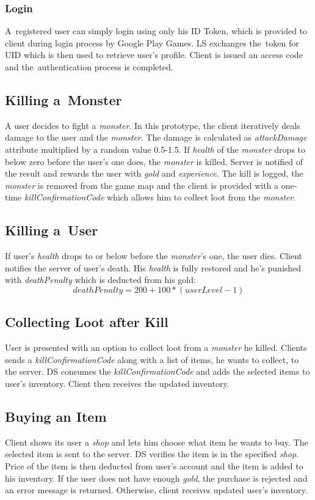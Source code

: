 		\subsubsection{Login}
		A~registered user can simply login using only his ID Token, which is provided to client during login process by Google Play Games. LS exchanges the~token for UID which is then used to retrieve user's profile. Client is issued an access code and the~authentication process is completed.
	
	\subsection{Killing a~Monster}
	A user decides to fight a \textit{monster}. In this prototype, the client iteratively deals damage to the user and the \textit{monster}. The damage is calculated as \textit{attackDamage} attribute multiplied by a random value 0.5-1.5. If \textit{health} of the \textit{monster} drops to below zero before the user's one does, the \textit{monster} is killed. Server is notified of the result and rewards the user with \textit{gold} and \textit{experience}. The kill is logged, the \textit{monster} is removed from the game map and the client is provided with a one-time \textit{killConfirmationCode} which allows him to collect loot from the \textit{monster}.
		
	\subsection{Killing a~User}
	If user's \textit{health} drops to or below before the \textit{monster}'s one, the user dies. Client notifies the server of user's death. His \textit{health} is fully restored and he's punished with \textit{deathPenalty} which is deducted from his gold:  \[ deathPenalty = 200 + 100 * (userLevel - 1) \]
	
	\subsection{Collecting Loot after Kill}
	User is presented with an option to collect loot from a \textit{monster} he killed. Clients sends a \textit{killConfirmationCode} along with a list of items, he wants to collect, to the server. DS consumes the \textit{killConfirmationCode} and adds the selected items to user's inventory. Client then receives the updated inventory.
	
	\subsection{Buying an Item}
	Client shows its user a \textit{shop} and lets him choose what item he wants to buy. The selected item is sent to the server. DS verifies the item is in the specified \textit{shop}. Price of the item is then deducted from user's account and the item is added to his inventory. If the user does not have enough \textit{gold}, the purchase is rejected and an error message is returned. Otherwise, client receives updated user's inventory.
	
